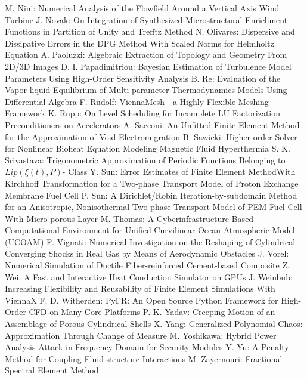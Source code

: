 \documentclass[10pt, A4]{article}%
\begin{document}
{M. Nini}: {Numerical Analysis of the Flowfield Around a Vertical Axis Wind Turbine}
{J. Novak}: {On Integration of Synthesized Microstructural Enrichment Functions in Partition of Unity and Trefftz Method}
{N. Olivares}: {Dispersive and Dissipative Errors in the DPG Method With Scaled Norms for Helmholtz Equation}
{A. Paoluzzi}: {Algebraic Extraction of Topology and Geometry From 2D/3D Images}
{D. I. Papadimitriou}: {Bayesian Estimation of Turbulence Model Parameters Using High-Order Sensitivity Analysis}
{B. Re}: {Evaluation of the Vapor-liquid Equilibrium of Multi-parameter Thermodynamics Models Using Differential Algebra}
{F. Rudolf}: {ViennaMesh - a Highly Flexible Meshing Framework}
{K. Rupp}: {On Level Scheduling for Incomplete LU Factorization Preconditioners on Accelerators}
{A. Sacconi}: {An Unfitted Finite Element Method for the Approximation of Void Electromigration}
{B. Sawicki}: {Higher-order Solver for Nonlinear Bioheat Equation Modeling Magnetic Fluid Hyperthermia}
{S. K. Srivastava}: {Trigonometric Approximation of Periodic Functions Belonging to $Lip(\xi(t), P)$- Class}
{Y. Sun}: {Error Estimates of Finite Element MethodWith Kirchhoff Transformation for a Two-phase Transport Model of Proton Exchange Membrane Fuel Cell}
{P. Sun}: {A Dirichlet/Robin Iteration-by-subdomain Method for an Anisotropic, Nonisothermal Two-phase Transport Model of PEM Fuel Cell With Micro-porous Layer}
{M. Thomas}: {A Cyberinfrastructure-Based Computational Environment for Unified Curvilinear Ocean Atmospheric Model  (UCOAM)}
{F. Vignati}: {Numerical Investigation on the Reshaping of Cylindrical Converging Shocks in Real Gas by Means of Aerodynamic Obstacles}
{J. Vorel}: {Numerical Simulation of Ductile Fiber-reinforced Cement-based Composite}
{Z. Wei}: {A Fast and Interactive Heat Conduction Simulator on GPUs}
{J. Weinbub}: {Increasing Flexibility and Reusability of Finite Element Simulations With ViennaX}
{F. D. Witherden}: {PyFR: An Open Source Python Framework for High-Order CFD on Many-Core Platforms}
{P. K. Yadav}: {Creeping Motion of an Assemblage of Porous Cylindrical Shells}
{X. Yang}: {Generalized Polynomial Chaos: Approximation Through Change of Measure}
{M. Yoshikawa}: {Hybrid Power Analysis Attack in Frequency Domain for Security Modules}
{Y. Yu}: {A Penalty Method for Coupling Fluid-structure Interactions}
{M. Zayernouri}: {Fractional Spectral Element Method}

\end{document}

